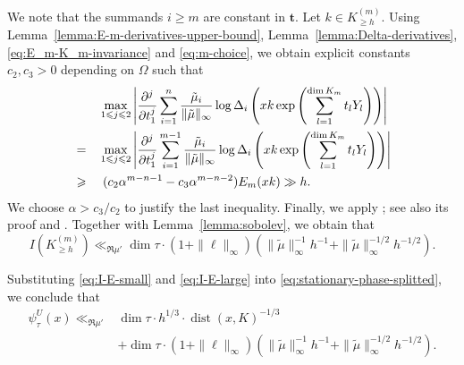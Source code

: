 \documentclass[11pt,oneside]{amsart}
\numberwithin{equation}{section}
\theoremstyle{remark}
\theoremstyle{plain}
\DeclareMathOperator{\dist}{dist}
\newcommand{\bt}{\mathbf{t}}
\renewcommand\leq{\leqslant}
\renewcommand\geq{\geqslant}
\begin{document}
We note that the summands $i \geq m$ are constant in $\bt$. Let $k\in K^{(m)}_{\geq h}$. Using Lemma~\ref{lemma:E-m-derivatives-upper-bound}, Lemma~\ref{lemma:Delta-derivatives}, \eqref{eq:E_m-K_m-invariance} and \eqref{eq:m-choice}, we obtain explicit constants $c_2,c_3>0$ depending on $\Omega$ such that
\begin{alignat}{2}\label{stat-phase-lowerbound}
\notag & & & \max_{1\leq j\leq 2} \left| \frac{\partial^j}{\partial t_1^j} \sum_{i=1}^n \frac{\tilde{\mu}_i}{\|\tilde{\mu}\|_{\infty}} \log \Delta_i\left(x k \exp\left(\sum_{l=1}^{\dim K_{m}} t_l Y_l\right)\right)\right|\\
\notag & = & & \max_{1\leq j\leq 2} \left| \frac{\partial^j}{\partial t_1^j} \sum_{i=1}^{m-1} \frac{\tilde{\mu}_i}{\|\tilde{\mu}\|_{\infty}} \log \Delta_i\left(x k \exp\left(\sum_{l=1}^{\dim K_{m}} t_l Y_l\right)\right)\right|\\
& \geq & &\ (c_2 \alpha^{m-n-1}-c_3 \alpha^{m-n-2}) E_{m}(x k) \gg h .
\end{alignat}
We choose $\alpha>c_3/c_2$ to justify the last inequality. Finally, we apply \cite[Prop.~5 on p.~342]{St}; see also its proof and \cite[Cor. \& (6) on p.~334]{St}. Together with Lemma~\ref{lemma:sobolev}, we obtain that
\begin{equation}\label{eq:I-E-large}
I\left(K^{(m)}_{\geq h}\right) \ll_{\Re\mu'} \dim \tau \cdot (1+\|\bm{\ell}\|_{\infty})
\left(\|\tilde{\mu}\|_{\infty}^{-1}h^{-1} + \|\tilde{\mu}\|_{\infty}^{-1/2}h^{-1/2}\right).
\end{equation}

Substituting \eqref{eq:I-E-small} and \eqref{eq:I-E-large} into \eqref{eq:stationary-phase-splitted}, we conclude that
\begin{equation}\label{eq:stationary-phase-upshot}
\begin{split}
\psi_\tau^{U}(x) \ll_{\Re\mu'}
&\dim \tau \cdot h^{1/3} \cdot \dist(x,K)^{-1/3}\\
& + \dim \tau \cdot (1+\|\bm{\ell}\|_{\infty})\left(\|\tilde{\mu}\|_{\infty}^{-1}h^{-1} + \|\tilde{\mu}\|_{\infty}^{-1/2}h^{-1/2}\right).
\end{split}
\end{equation}
\end{document}
